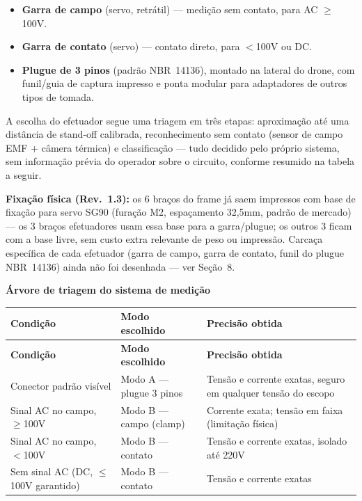 \documentclass[11pt,a4paper]{article}
\begin{document}
\begin{itemize}[itemsep=2pt]
  \item \textbf{Garra de campo} (servo, retrátil) — medição sem contato, para AC $\geq$100V.
  \item \textbf{Garra de contato} (servo) — contato direto, para $<$100V ou DC.
  \item \textbf{Plugue de 3 pinos} (padrão NBR~14136), montado na lateral do drone, com funil/guia de captura impresso e ponta modular para adaptadores de outros tipos de tomada.
\end{itemize}

A escolha do efetuador segue uma triagem em três etapas: aproximação até uma distância de stand-off calibrada, reconhecimento sem contato (sensor de campo EMF + câmera térmica) e classificação — tudo decidido pelo próprio sistema, sem informação prévia do operador sobre o circuito, conforme resumido na tabela a seguir.

\textbf{Fixação física (Rev.~1.3):} os 6 braços do frame já saem impressos com base de fixação para servo SG90 (furação M2, espaçamento 32,5mm, padrão de mercado) — os 3 braços efetuadores usam essa base para a garra/plugue; os outros 3 ficam com a base livre, sem custo extra relevante de peso ou impressão. Carcaça específica de cada efetuador (garra de campo, garra de contato, funil do plugue NBR~14136) ainda não foi desenhada — ver Seção~8.

\textbf{Árvore de triagem do sistema de medição}\\[0.4em]
\begin{longtable}{@{}p{4.6cm}p{4.6cm}p{5cm}@{}}
\toprule
\textbf{Condição} & \textbf{Modo escolhido} & \textbf{Precisão obtida} \\
\midrule
\endfirsthead
\toprule
\textbf{Condição} & \textbf{Modo escolhido} & \textbf{Precisão obtida} \\
\midrule
\endhead
\bottomrule
\endfoot
Conector padrão visível & Modo A — plugue 3 pinos & Tensão e corrente exatas, seguro em qualquer tensão do escopo \\
Sinal AC no campo, $\geq$100V & Modo B — campo (clamp) & Corrente exata; tensão em faixa (limitação física) \\
Sinal AC no campo, $<$100V & Modo B — contato & Tensão e corrente exatas, isolado até 220V \\
Sem sinal AC (DC, $\leq$100V garantido) & Modo B — contato & Tensão e corrente exatas \\
\end{longtable}
\end{document}
